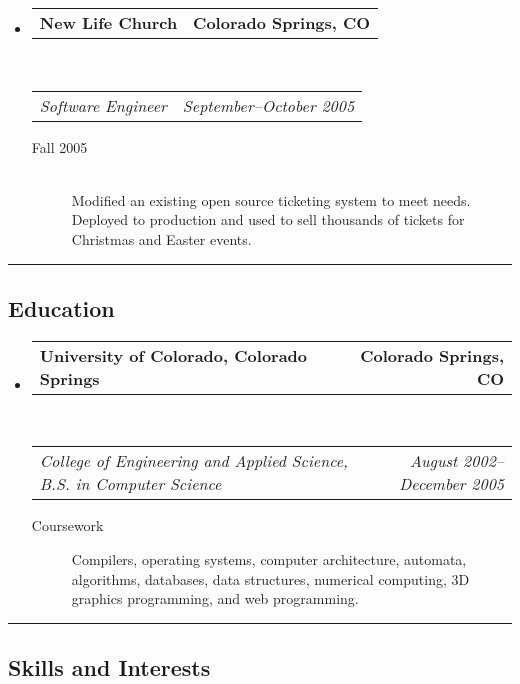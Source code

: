 \documentclass[10pt,letterpaper]{article}
\makeatletter
\newcommand{\headerrow}[2]
{\begin{tabular*}{\linewidth}{l@{\extracolsep{\fill}}r}
  #1 &
  #2 \\
\end{tabular*}}
\makeatother
\begin{document}
\begin{itemize}
  \item
  \headerrow
    {\textbf{New Life Church}}
    {\textbf{Colorado Springs, CO}}
  \\
  \headerrow
    {\emph{Software Engineer}}
    {\emph{September--October 2005}}
  \begin{description}
    \item[Fall 2005] \hfill \\
        Modified an existing open source ticketing system to meet needs. \\
        Deployed to production and used to sell thousands of tickets for Christmas and Easter events.
  \end{description}

\end{itemize}


\hrule
\vspace{-0.4em}
\subsection*{Education}

\begin{itemize}
  \parskip=0.1em

  \item
  \headerrow
    {\textbf{University of Colorado, Colorado Springs}}
    {\textbf{Colorado Springs, CO}}
  \\
  \headerrow
    {\emph{College of Engineering and Applied Science, B.S. in Computer Science}}
    {\emph{August 2002--December 2005}}
  \begin{description}
    \item[Coursework] Compilers, operating systems, computer architecture, automata, algorithms, databases, data structures, numerical computing, 3D graphics programming, and web programming.
  \end{description}

\end{itemize}


\hrule
\vspace{-0.4em}
\subsection*{Skills and Interests}
\end{document}
